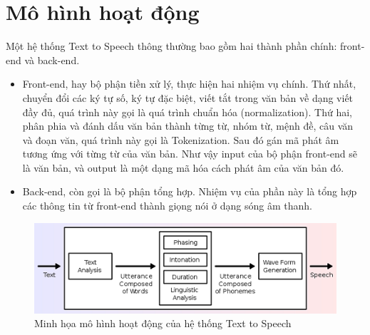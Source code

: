 \section{Mô hình hoạt động}
Một hệ thống Text to Speech thông thường bao gồm hai thành phần chính: front-end và back-end.
\begin{itemize}
\item Front-end, hay bộ phận tiền xử lý, thực hiện hai nhiệm vụ chính. Thứ nhất, chuyển đổi các ký tự số, ký tự đặc biệt, viết tắt trong văn bản về dạng viết đầy đủ, quá trình này gọi là quá trình chuẩn hóa (normalization). Thứ hai, phân phia và đánh dấu văn bản thành từng từ, nhóm từ, mệnh đề, câu văn và đoạn văn, quá trình này gọi là Tokenization. Sau đó gán mã phát âm tương ứng với từng từ của văn bản. Như vậy input của bộ phận front-end sẽ là văn bản, và output là một dạng mã hóa cách phát âm của văn bản đó.
\item Back-end, còn gọi là bộ phận tổng hợp. Nhiệm vụ của phần này là tổng hợp các thông tin từ front-end thành giọng nói ở dạng sóng âm thanh.
\end{itemize}
\begin{figure}[h]
    \centering
    \includegraphics[scale=1]{ttsmodel}
    \caption{Minh họa mô hình hoạt động của hệ thống Text to Speech}
    \label{fig:c4_ttsmodel}
\end{figure}

